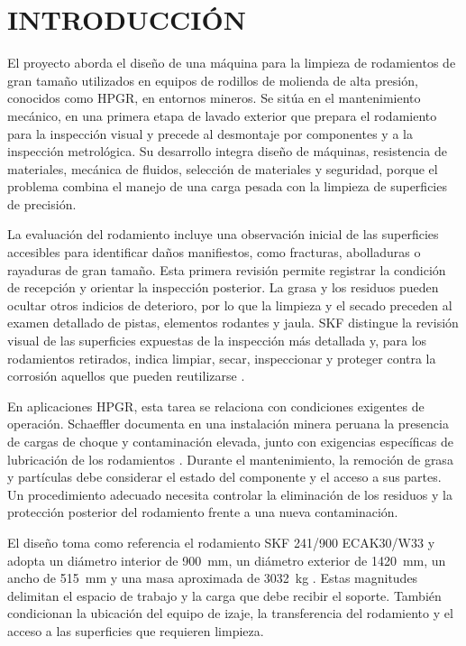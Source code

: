 \chapter{INTRODUCCIÓN}
\label{cap:introduccion}

El proyecto aborda el diseño de una máquina para la limpieza de rodamientos de gran tamaño utilizados en equipos de rodillos de molienda de alta presión, conocidos como HPGR, en entornos mineros. Se sitúa en el mantenimiento mecánico, en una primera etapa de lavado exterior que prepara el rodamiento para la inspección visual y precede al desmontaje por componentes y a la inspección metrológica. Su desarrollo integra diseño de máquinas, resistencia de materiales, mecánica de fluidos, selección de materiales y seguridad, porque el problema combina el manejo de una carga pesada con la limpieza de superficies de precisión.

La evaluación del rodamiento incluye una observación inicial de las superficies accesibles para identificar daños manifiestos, como fracturas, abolladuras o rayaduras de gran tamaño. Esta primera revisión permite registrar la condición de recepción y orientar la inspección posterior. La grasa y los residuos pueden ocultar otros indicios de deterioro, por lo que la limpieza y el secado preceden al examen detallado de pistas, elementos rodantes y jaula. SKF distingue la revisión visual de las superficies expuestas de la inspección más detallada y, para los rodamientos retirados, indica limpiar, secar, inspeccionar y proteger contra la corrosión aquellos que pueden reutilizarse \cite{skfmaintenance2011}.

En aplicaciones HPGR, esta tarea se relaciona con condiciones exigentes de operación. Schaeffler documenta en una instalación minera peruana la presencia de cargas de choque y contaminación elevada, junto con exigencias específicas de lubricación de los rodamientos \cite{schaeffler2021}. Durante el mantenimiento, la remoción de grasa y partículas debe considerar el estado del componente y el acceso a sus partes. Un procedimiento adecuado necesita controlar la eliminación de los residuos y la protección posterior del rodamiento frente a una nueva contaminación.

El diseño toma como referencia el rodamiento SKF 241/900 ECAK30/W33 y adopta un diámetro interior de \SI{900}{\milli\metre}, un diámetro exterior de \SI[group-minimum-digits=4]{1420}{\milli\metre}, un ancho de \SI{515}{\milli\metre} y una masa aproximada de \SI[group-minimum-digits=4]{3032}{\kilogram} \cite{skf241}. Estas magnitudes delimitan el espacio de trabajo y la carga que debe recibir el soporte. También condicionan la ubicación del equipo de izaje, la transferencia del rodamiento y el acceso a las superficies que requieren limpieza.

